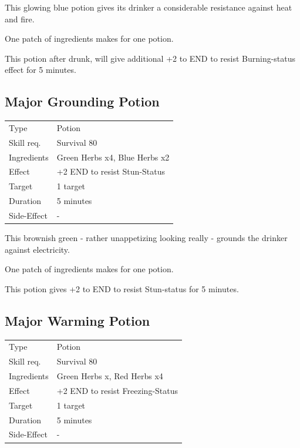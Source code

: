 \documentclass[11pt,a4paper,twocolumn]{book}
\begin{document}
\medskip

This glowing blue potion gives its drinker a considerable resistance against heat and fire.

One patch of ingredients makes for one potion.

This potion after drunk, will give additional +2 to END to resist Burning-status effect for 5 minutes.


\subsection*{Major Grounding Potion}
{
	\begin{tabu} to 75mm{| X[l,4] | X[l,8] |}
		\hline
		Type 			& Potion 													\\
        Skill req.	    & Survival 80 												\\
        Ingredients     & Green Herbs x4, Blue Herbs x2								\\
        Effect     		& +2 END to resist Stun-Status 								\\
        Target      	& 1 target													\\
        Duration  		& 5 minutes	 												\\
        Side-Effect     & -															\\ \hline
	\end{tabu}
		
}

\medskip

This brownish green - rather unappetizing looking really - grounds the drinker against electricity.

One patch of ingredients makes for one potion.

This potion gives +2 to END to resist Stun-status for 5 minutes.

\vfill

\subsection*{Major Warming Potion}
{
	\begin{tabu} to 75mm{| X[l,4] | X[l,8] |}
		\hline
		Type 			& Potion 													\\
        Skill req.	    & Survival 80 												\\
        Ingredients     & Green Herbs x, Red Herbs x4								\\
        Effect     		& +2 END to resist Freezing-Status 							\\
        Target      	& 1 target													\\
        Duration  		& 5 minutes	 												\\
        Side-Effect     & -															\\ \hline
	\end{tabu}
		
}
\end{document}
